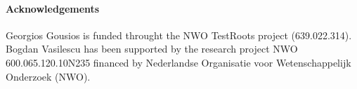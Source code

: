 
\paragraph*{Acknowledgements}
\label{sec:acknowledgements}

Georgios Gousios is funded throught the NWO TestRoots project (639.022.314).
Bogdan Vasilescu has been supported by the research project NWO 600.065.120.10N235 financed by Nederlandse Organisatie voor Wetenschappelijk Onderzoek (NWO). 
